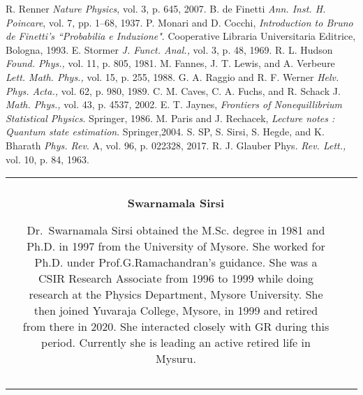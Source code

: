 \begin{thebibliography}{99}
 R. Renner \textit{Nature Physics}, vol. 3, p. 645, 2007.
 B. de Finetti \textit{Ann. Inst. H. Poincare}, vol. 7, pp. 1–68, 1937.
 P. Monari and D. Cocchi, \textit{Introduction to Bruno de Finetti's ``Probabilia e Induzione"}. Cooperative Libraria Universitaria Editrice, Bologna, 1993.
 E. Stormer \textit{J. Funct. Anal.,} vol. 3, p. 48, 1969.
 R. L. Hudson \textit{Found. Phys.,} vol. 11, p. 805, 1981.
 M. Fannes, J. T. Lewis, and A. Verbeure \textit{Lett. Math. Phys.,} vol. 15, p. 255, 1988.
 G. A. Raggio and R. F. Werner \textit{Helv. Phys. Acta.,} vol. 62, p. 980, 1989.
 C. M. Caves, C. A. Fuchs, and R. Schack J. \textit{Math. Phys.,} vol. 43, p. 4537, 2002.
 E. T. Jaynes, \textit{Frontiers of Nonequillibrium Statistical Physics}. Springer, 1986.
 M. Paris and J. Rechacek, \textit{Lecture notes : Quantum state estimation}. Springer,2004.
 S. SP, S. Sirsi, S. Hegde, and K. Bharath \textit{Phys. Rev}. A, vol. 96, p. 022328, 2017.
 R. J. Glauber Phys. \textit{Rev. Lett.,} vol. 10, p. 84, 1963.
\end{thebibliography}

\begin{tabular}{V{2.5}cp{6.2cm}V{2.5}}
 &\\
 & 

\centerline{\large\bf Swarnamala Sirsi }

\bigskip
Dr.~Swarnamala Sirsi obtained the M.Sc. degree in 1981 and Ph.D. in 1997 from the University of Mysore. She worked for Ph.D. under Prof.G.Ramachandran’s guidance. She was a CSIR Research Associate from 1996 to 1999 while doing research at the Physics Department, Mysore University. She then joined Yuvaraja College, Mysore, in 1999 and retired from there in 2020. She interacted closely with GR during this period. Currently she is leading an active retired life in Mysuru.\\
&\\ 
\end{tabular}
